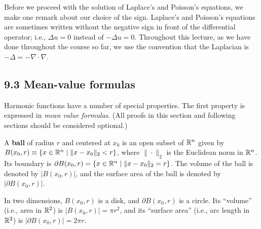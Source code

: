 Before we proceed with the solution of Laplace's and Poisson's equations, we make one remark about our choice of the sign. Laplace's and Poisson's equations are sometimes written without the negative sign in front of the differential operator; i.e., $\Delta u = 0$ instead of $-\Delta u = 0$. Throughout this lecture, as we have done throughout the course so far, we use the convention that the Laplacian is $-\Delta = -\nabla \cdot \nabla$.

\subsection{9.3 Mean-value formulas}
Harmonic functions have a number of special properties. The first property is expressed in \textit{mean value formulas}. (All proofs in this section and following sections should be considered optional.)

\begin{definition}[Ball in $\R^n$][9.2]
    A \textbf{ball} of radius $r$ and centered at $x_0$ is an open subset of $\R^n$ given by $B(x_0, r) \equiv \{x \in \mathbb{R}^n \mid \|x - x_0\|_2 < r\}$, where $\|\cdot\|_2$ is the Euclidean norm in $\R^n$. Its boundary is $\partial B(x_0, r) = \{x \in \mathbb{R}^n \mid \|x - x_0\|_2 = r\}$. The volume of the ball is denoted by $|B(x_0, r)|$, and the surface area of the ball is denoted by $|\partial B(x_0, r)|$.
\end{definition}

\begin{example}[][9.3]
    In two dimensions, $B(x_0, r)$ is a disk, and $\partial B(x_0, r)$ is a circle. Its ``volume'' (i.e., area in $\mathbb{R}^2$) is $|B(x_0, r)| = \pi r^2$, and its ``surface area'' (i.e., arc length in $\mathbb{R}^2$) is $|\partial B(x_0, r)| = 2\pi r$.
\end{example}

